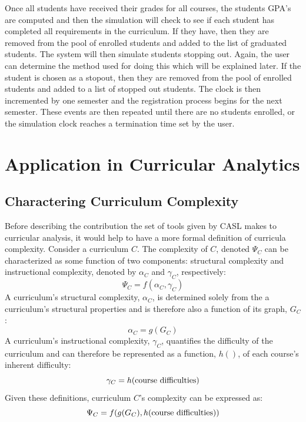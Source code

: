 \documentclass[botnum, fleqn]{unmeethesis}
\begin{document}
    Once all students have received their grades for all courses, the students GPA's are computed and then the simulation will check to see if each student has completed all requirements in the curriculum. If they have, then they are removed from the pool of enrolled students and added to the list of graduated students. The system will then simulate students stopping out. Again, the user can determine the method used for doing this which will be explained later. If the student is chosen as a stopout, then they are removed from the pool of enrolled students and added to a list of stopped out students. The clock is then incremented by one semester and the registration process begins for the next semester. These events are then repeated until there are no students enrolled, or the simulation clock reaches a termination time set by the user.


\chapter{Application in Curricular Analytics}

  \section{Charactering Curriculum Complexity}
    Before describing the contribution the set of tools given by CASL makes to curricular analysis, it would help to have a more formal definition of curricula complexity. Consider a curriculum $C$. The complexity of $C$, denoted $\Psi_C$ can be characterized as some function of two components: structural complexity and instructional complexity, denoted by $\alpha_C$ and $\gamma_C$, respectively:
    \[
      \Psi_C = f(\alpha_C, \gamma_C)
    \]
    A curriculum's structural complexity, $\alpha_C$, is determined solely from the a curriculum's structural properties and is therefore also a function of its graph, $G_C$:
    \[
      \alpha_C = g(G_C)
    \]
    A curriculum's instructional complexity, $\gamma_C$, quantifies the difficulty of the curriculum and can therefore be represented as a function, $h()$, of each course's inherent difficulty:
    \[
      \gamma_C = h(\mbox{\rm course difficulties})
    \]
    Given these definitions, curriculum $C$'s complexity can be expressed as:
    \[
      \Psi_C = f(g(G_C), h(\mbox{\rm course difficulties}))
    \]
\end{document}
